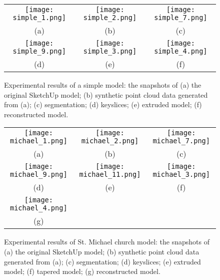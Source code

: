 \begin{figure} [htbp]
\begin{center}
\begin{tabular}{ccc}
\texttt{[image: simple\_1.png]} &
\texttt{[image: simple\_2.png]} &
\texttt{[image: simple\_7.png]} \\
(a) & (b) & (c)\\
\texttt{[image: simple\_9.png]} &
\texttt{[image: simple\_3.png]} &
\texttt{[image: simple\_4.png]} \\
(d) & (e) & (f)
\end{tabular}
\end{center}
\caption{ Experimental results of a simple model: the snapshots of
      (a) the original SketchUp model;
      (b) synthetic point cloud data generated from (a);
      (c) segmentation;
      (d) keyslices;
      (e) extruded model;
      (f) reconstructed model.
}
\label{fig:ER_Fig9}
\end{figure}

\begin{figure} [htbp]
\begin{center}
\begin{tabular}{ccc}
\texttt{[image: michael\_1.png]} &
\texttt{[image: michael\_2.png]} &
\texttt{[image: michael\_7.png]} \\
(a) & (b) & (c) \\
\texttt{[image: michael\_9.png]} &
\texttt{[image: michael\_11.png]} &
\texttt{[image: michael\_3.png]} \\
(d) & (e) & (f) \\
\texttt{[image: michael\_4.png]} \\
(g)
\end{tabular}
\end{center}
\caption{ Experimental results of St. Michael church model: the snapshots of
      (a) the original SketchUp model;
      (b) synthetic point cloud data generated from (a);
      (c) segmentation;
      (d) keyslices;
      (e) extruded model;
      (f) tapered model;
      (g) reconstructed model.
}
\label{fig:ER_Fig10}
\end{figure}



